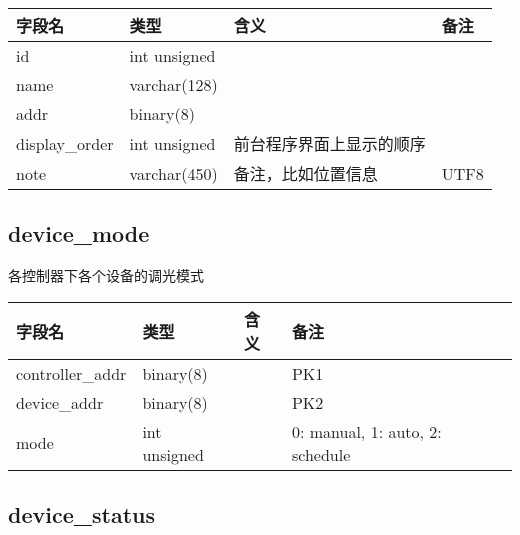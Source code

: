 \begin{longtabu}[c]{@{}lXXX@{}}
\toprule
字段名 & 类型 & 含义 & 备注\tabularnewline
\midrule
\endhead
id & int unsigned & &\tabularnewline
name & varchar(128) & &\tabularnewline
addr & binary(8) & &\tabularnewline
display\_order & int unsigned & 前台程序界面上显示的顺序
&\tabularnewline
note & varchar(450) & 备注，比如位置信息 & UTF8\tabularnewline
\bottomrule
\end{longtabu}

\subsection{device\_mode}\label{deviceux5fmode}

各控制器下各个设备的调光模式

\begin{longtabu}[c]{@{}lXXX@{}}
\toprule
字段名 & 类型 & 含义 & 备注\tabularnewline
\midrule
\endhead
controller\_addr & binary(8) & & PK1\tabularnewline
device\_addr & binary(8) & & PK2\tabularnewline
mode & int unsigned & & 0: manual, 1: auto, 2: schedule\tabularnewline
\bottomrule
\end{longtabu}

\subsection{device\_status}\label{deviceux5fstatus}

